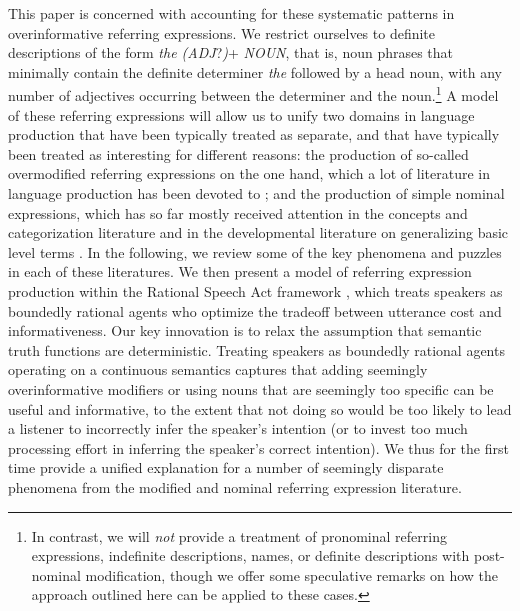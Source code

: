 \documentclass[11pt]{article}
\newcommand{\cg}[1]{\textcolor{Purple}{[cg: #1]}}
\begin{document}
This paper is concerned with accounting for these systematic patterns in overinformative referring expressions. We restrict ourselves to definite descriptions of the form \emph{the (ADJ}?\emph{)}+ \emph{NOUN}, that is, noun phrases that minimally contain the definite determiner \emph{the} followed by a head noun, with any number of adjectives occurring between the determiner and the noun.\footnote{In contrast, we will \emph{not} provide a treatment of pronominal referring expressions, indefinite descriptions, names, or definite descriptions with post-nominal modification, though we offer some speculative remarks on how the approach outlined here can be applied to these cases.} A model of these referring expressions will allow us to unify two domains in language production that have been typically treated as separate, and that have typically been treated as interesting for different reasons: the production of so-called overmodified referring expressions on the one hand, which a lot of literature in language production has been devoted to \cite{herrmann1976, Pechmann1989, nadig2002, sedivy2003a, Maes2004, Engelhardt2006, Arts2011, Koolen2011, rubiofernandez2016}; and the production of simple nominal expressions, which has so far mostly received attention in the concepts and categorization literature \cite{Rosch1973, Rosch1976} and in the developmental literature on  generalizing basic level terms \cite{Xu2007}. %
In the following, we review some of the key phenomena and puzzles in each of these literatures. We then present a model of referring expression production within the Rational Speech Act framework \cite{frank2012, goodman2016}, which treats speakers as boundedly rational agents who optimize the tradeoff between utterance cost and informativeness. Our key innovation is to relax the assumption that semantic truth functions are deterministic. Treating speakers as boundedly rational agents operating on a continuous semantics captures that adding seemingly overinformative modifiers or using  nouns that are seemingly too specific can be useful and informative, to the extent that not doing so would be too likely to lead a listener to incorrectly infer the speaker's intention (or to invest too much processing effort in inferring the speaker's correct intention). We thus for the first time provide a unified explanation for a number of seemingly disparate phenomena from the modified and nominal referring expression literature. 
\end{document}
